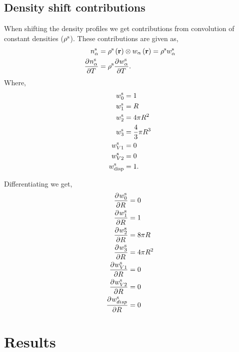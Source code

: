 \documentclass[12pt, letterpaper]{article}
\newcommand*{\pd}[3][]{\frac{\partial^{#1}#2}{\partial{#3}^{#1}}}%
\newcommand*{\lb}{\ensuremath{\left(}}
\newcommand*{\rb}{\ensuremath{\right)}}
\newcommand{\disp}{\ensuremath{\text{disp}}\xspace}
\begin{document}
\subsection{Density shift contributions}

When shifting the density profiles we get contributions from convolution of constant densities ($\rho^{\rm{s}}$). These contributions are given as,
\begin{align}
  \label{eq:n_alpha_diff_steady}
  n_\alpha^{\rm{s}} &= \rho^{\rm{s}} \lb \mathbf{r} \rb \otimes w_\alpha \lb \mathbf{r}\rb = \rho^{\rm{s}} w_\alpha^{\rm{s}} \\
  \pd{n_\alpha^{\rm{s}}}{T} &= \rho^{\rm{s}} \pd{w_\alpha^{\rm{s}}}{T}.
\end{align}
Where,
\begin{align}
  \label{eq:weight_functions_steady}
  w_0^{\rm{s}} &= 1  \\
  w_1^{\rm{s}} &= R  \\
  w_2^{\rm{s}} &= 4 \pi R^2  \\
  w_3^{\rm{s}} &= \frac{4}{3} \pi R^3  \\
  w_{V1}^{\rm{s}} &= 0  \\
  w_{V2}^{\rm{s}} &= 0  \\
  w_{\disp}^{\rm{s}} &= 1.
\end{align}

Differentiating we get,
\begin{align}
  \label{eq:weight_functions_steady_diff}
  \pd{w_0^{\rm{s}}}{R} &= 0  \\
  \pd{w_1^{\rm{s}}}{R} &= 1  \\
  \pd{w_2^{\rm{s}}}{R} &= 8 \pi R  \\
  \pd{w_3^{\rm{s}}}{R} &= 4 \pi R^2  \\
  \pd{w_{V1}^{\rm{s}}}{R} &= 0  \\
  \pd{w_{V2}^{\rm{s}}}{R} &= 0  \\
  \pd{w_{disp}^{\rm{s}}}{R} &= 0
\end{align}

\section{Results}



\clearpage


\end{document}
